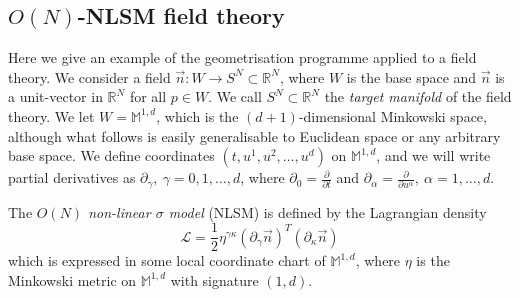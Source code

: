 






\subsection{$O(N)$-NLSM field theory} \label{sec:The O(3) non-linear sigma model}

Here we give an example of the geometrisation programme applied to a field theory. We consider a field $\vec{n} : W \to S^N \subset \mathbb{R}^N$, where $W$ is the base space and $\vec{n}$ is a unit-vector in $\mathbb{R}^N$ for all $p \in W$. We call $S^N \subset \mathbb{R}^N$ the \textit{target manifold} of the field theory. We let $W = \mathbb{M}^{1,d}$, which is the $(d+1)$-dimensional Minkowski space, although what follows is easily generalisable to Euclidean space or any arbitrary base space.  
 We define coordinates $(t, u^1, u^2, \dots, u^d)$ on $\mathbb{M}^{1,d}$, and we will write partial derivatives as $\partial_\gamma,\ \gamma=0,1,\dots,d$, where $\partial_0 = \frac{\partial}{\partial t}$ and $\partial_\alpha = \frac{\partial}{\partial u^\alpha},\ \alpha=1,\dots,d$.

The \textit{$O(N)$ non-linear $\sigma$ model} (NLSM)\citep{ketovQuantumNonlinearSigmaModels2013} is defined by the Lagrangian density
\begin{equation} \label{eq:O(N) model}
\mathcal{L} = \frac{1}{2} \eta^{\gamma \kappa} (\partial_\gamma \vec{n})^T (\partial_\kappa \vec{n}) 
\end{equation}
which is expressed in some local coordinate chart of $\mathbb{M}^{1,d}$, where $\eta$ is the Minkowski metric on $\mathbb{M}^{1,d}$ with signature $(1,d)$.

